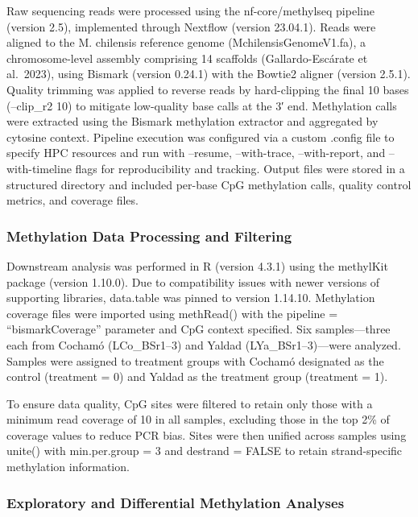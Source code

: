 \documentclass[
]{agujournal2019}
\begin{document}
Raw sequencing reads were processed using the nf-core/methylseq pipeline
(version 2.5), implemented through Nextflow (version 23.04.1). Reads
were aligned to the M. chilensis reference genome
(MchilensisGenomeV1.fa), a chromosome-level assembly comprising 14
scaffolds (Gallardo-Escárate et al.~2023), using Bismark (version
0.24.1) with the Bowtie2 aligner (version 2.5.1). Quality trimming was
applied to reverse reads by hard-clipping the final 10 bases (--clip\_r2
10) to mitigate low-quality base calls at the 3′ end. Methylation calls
were extracted using the Bismark methylation extractor and aggregated by
cytosine context. Pipeline execution was configured via a custom .config
file to specify HPC resources and run with --resume, --with-trace,
--with-report, and --with-timeline flags for reproducibility and
tracking. Output files were stored in a structured directory and
included per-base CpG methylation calls, quality control metrics, and
coverage files.

\subsubsection{Methylation Data Processing and
Filtering}\label{methylation-data-processing-and-filtering}

Downstream analysis was performed in R (version 4.3.1) using the
methylKit package (version 1.10.0). Due to compatibility issues with
newer versions of supporting libraries, data.table was pinned to version
1.14.10. Methylation coverage files were imported using methRead() with
the pipeline = ``bismarkCoverage'' parameter and CpG context specified.
Six samples---three each from Cochamó (LCo\_BSr1--3) and Yaldad
(LYa\_BSr1--3)---were analyzed. Samples were assigned to treatment
groups with Cochamó designated as the control (treatment = 0) and Yaldad
as the treatment group (treatment = 1).

To ensure data quality, CpG sites were filtered to retain only those
with a minimum read coverage of 10 in all samples, excluding those in
the top 2\% of coverage values to reduce PCR bias. Sites were then
unified across samples using unite() with min.per.group = 3 and destrand
= FALSE to retain strand-specific methylation information.

\subsubsection{Exploratory and Differential Methylation
Analyses}\label{exploratory-and-differential-methylation-analyses}
\end{document}
